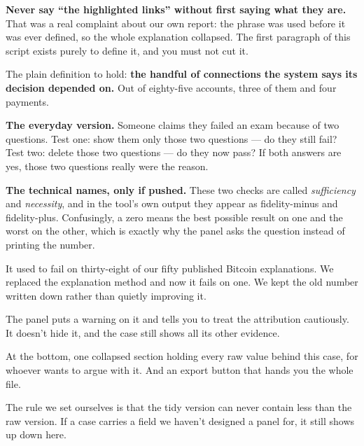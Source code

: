 \documentclass[11pt]{article}
\begin{document}
\begin{means}
\textbf{Never say ``the highlighted links'' without first saying what they
are.} That was a real complaint about our own report: the phrase was used
before it was ever defined, so the whole explanation collapsed. The first
paragraph of this script exists purely to define it, and you must not cut it.

The plain definition to hold: \textbf{the handful of connections the system
says its decision depended on.} Out of eighty-five accounts, three of them and
four payments.

\textbf{The everyday version.} Someone claims they failed an exam because of
two questions. Test one: show them only those two questions --- do they still
fail? Test two: delete those two questions --- do they now pass? If both
answers are yes, those two questions really were the reason.

\textbf{The technical names, only if pushed.} These two checks are called
\emph{sufficiency} and \emph{necessity}, and in the tool's own output they
appear as fidelity-minus and fidelity-plus. Confusingly, a zero means the best
possible result on one and the worst on the other, which is exactly why the
panel asks the question instead of printing the number.
\end{means}

\begin{asked}
 It used to fail on thirty-eight of our
fifty published Bitcoin explanations. We replaced the explanation method and
now it fails on one. We kept the old number written down rather than quietly
improving it.

 The panel puts a warning on
it and tells you to treat the attribution cautiously. It doesn't hide it, and
the case still shows all its other evidence.
\end{asked}


\begin{saythis}
At the bottom, one collapsed section holding every raw value behind this case,
for whoever wants to argue with it. And an export button that hands you the
whole file.

The rule we set ourselves is that the tidy version can never contain less than
the raw version. If a case carries a field we haven't designed a panel for, it
still shows up down here.
\end{saythis}
\end{document}
